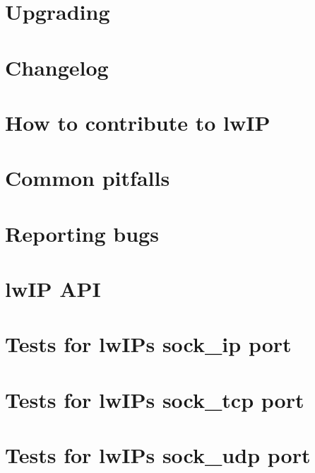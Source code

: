 \documentclass[twoside]{book}
\newcommand{\+}{\discretionary{\mbox{\scriptsize$\hookleftarrow$}}{}{}}
\begin{document}
\chapter{Upgrading}
\label{upgrading}

\chapter{Changelog}
\label{changelog}

\chapter{How to contribute to lw\+IP}
\label{contrib}

\chapter{Common pitfalls}
\label{pitfalls}

\chapter{Reporting bugs}
\label{bugs}

\chapter{lw\+IP A\+PI}
\label{raw_api}

\chapter{Tests for lw\+IP\textquotesingle{}s sock\+\_\+ip port}
\label{md__home_ayush_RIOT_tests_lwip_sock_ip_README}

\chapter{Tests for lw\+IP\textquotesingle{}s sock\+\_\+tcp port}
\label{md__home_ayush_RIOT_tests_lwip_sock_tcp_README}

\chapter{Tests for lw\+IP\textquotesingle{}s sock\+\_\+udp port}
\label{md__home_ayush_RIOT_tests_lwip_sock_udp_README}

\end{document}
